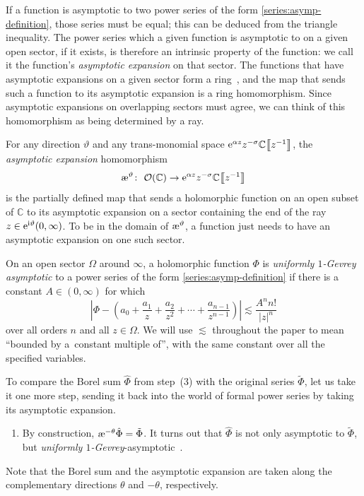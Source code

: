 \documentclass[10pt,a4paper]{amsart}
\newcommand{\C}{\mathbb{C}}
\newcommand{\series}[1]{\tilde{#1}}
\newcommand{\aexp}{\text{\rm \ae}}
\numberwithin{equation}{section}
\begin{document}
If a function is asymptotic to two power series of the form \eqref{series:asymp-definition}, those series must be equal; this can be deduced from the triangle inequality. The power series which a given function is asymptotic to on a given open sector, if it exists, is therefore an intrinsic property of the function: we call it the function's {\em asymptotic expansion} on that sector. The functions that have asymptotic expansions on a given sector form a ring~\cite[Appendix~A.4]{nikolaev2023existence}, and the map that sends such a function to its asymptotic expansion is a ring homomorphism. Since asymptotic expansions on overlapping sectors must agree, we can think of this homomorphism as being determined by a ray.
\begin{Definition}
For any direction $\vartheta$ and any trans-monomial space ${\rm e}^{\alpha z} z^{-\sigma} \C \big\llbracket z^{-1} \big\rrbracket$, the {\em asymptotic expansion} homomorphism
\[
 \aexp^\vartheta \colon\ \mathcal{O}(\C) \to {\rm e}^{\alpha z} z^{-\sigma} \C \big\llbracket z^{-1} \big\rrbracket\]
is the partially defined map that sends a holomorphic function on an open subset of $\C$ to its asymptotic expansion on a sector containing the end of the ray $z \in {\rm e}^{{\rm i}\vartheta}(0, \infty)$. To be in the domain of $\aexp^\vartheta$, a function just needs to have an asymptotic expansion on one such sector.
\end{Definition}
\begin{Definition}\label{def:unif-gevrey-asymp}
On an open sector $\Omega$ around $\infty$, a holomorphic function $\Phi$ is {\em uniformly $1$-Gevrey asymptotic} to a power series of the form \eqref{series:asymp-definition} if there is a constant $A \in (0, \infty)$ for which
\[ \left|\Phi - \left(a_0 + \frac{a_1}{z} + \frac{a_2}{z^2} + \cdots + \frac{a_{n-1}}{z^{n-1}} \right) \right| \lesssim \frac{A^n n!}{|z|^n} \]
over all orders $n$ and all $z \in \Omega$. We will use $\lesssim$ throughout the paper to mean ``bounded by a~constant multiple of'', with the same constant over all the specified variables.
\end{Definition}
To compare the Borel sum $\hat{\Phi}$ from step~(3) with the original series $\series{\Phi}$, let us take it one more step, sending it back into the world of formal power series by taking its asymptotic expansion.
\begin{enumerate}[start=4]\itemsep=0pt
\item[(4)] By construction, $\aexp^{-\theta} \hat{\Phi} = \series{\Phi}$. It turns out that $\hat{\Phi}$ is not only asymptotic to $\series{\Phi}$, but {\em {uniformly} $1$-Gevrey}-asymptotic~\cite[Corollary~5.23]{diverg-resurg-i}.
\end{enumerate}
Note that the Borel sum and the asymptotic expansion are taken along the complementary directions $\theta$ and $-\theta$, respectively.
\end{document}
